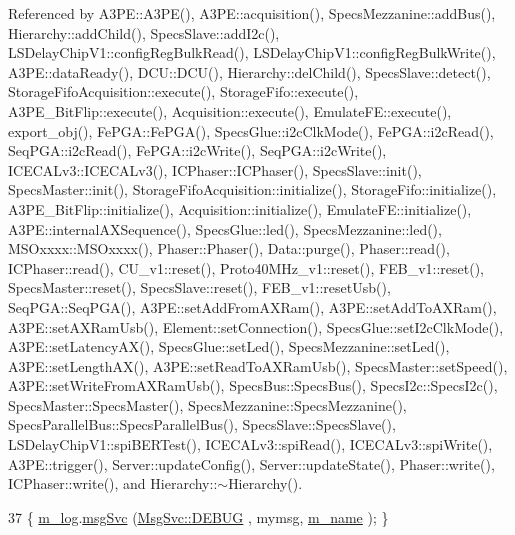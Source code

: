 Referenced by A3\+P\+E\+::\+A3\+P\+E(), A3\+P\+E\+::acquisition(), Specs\+Mezzanine\+::add\+Bus(), Hierarchy\+::add\+Child(), Specs\+Slave\+::add\+I2c(), L\+S\+Delay\+Chip\+V1\+::config\+Reg\+Bulk\+Read(), L\+S\+Delay\+Chip\+V1\+::config\+Reg\+Bulk\+Write(), A3\+P\+E\+::data\+Ready(), D\+C\+U\+::\+D\+C\+U(), Hierarchy\+::del\+Child(), Specs\+Slave\+::detect(), Storage\+Fifo\+Acquisition\+::execute(), Storage\+Fifo\+::execute(), A3\+P\+E\+\_\+\+Bit\+Flip\+::execute(), Acquisition\+::execute(), Emulate\+F\+E\+::execute(), export\+\_\+obj(), Fe\+P\+G\+A\+::\+Fe\+P\+G\+A(), Specs\+Glue\+::i2c\+Clk\+Mode(), Fe\+P\+G\+A\+::i2c\+Read(), Seq\+P\+G\+A\+::i2c\+Read(), Fe\+P\+G\+A\+::i2c\+Write(), Seq\+P\+G\+A\+::i2c\+Write(), I\+C\+E\+C\+A\+Lv3\+::\+I\+C\+E\+C\+A\+Lv3(), I\+C\+Phaser\+::\+I\+C\+Phaser(), Specs\+Slave\+::init(), Specs\+Master\+::init(), Storage\+Fifo\+Acquisition\+::initialize(), Storage\+Fifo\+::initialize(), A3\+P\+E\+\_\+\+Bit\+Flip\+::initialize(), Acquisition\+::initialize(), Emulate\+F\+E\+::initialize(), A3\+P\+E\+::internal\+A\+X\+Sequence(), Specs\+Glue\+::led(), Specs\+Mezzanine\+::led(), M\+S\+Oxxxx\+::\+M\+S\+Oxxxx(), Phaser\+::\+Phaser(), Data\+::purge(), Phaser\+::read(), I\+C\+Phaser\+::read(), C\+U\+\_\+v1\+::reset(), Proto40\+M\+Hz\+\_\+v1\+::reset(), F\+E\+B\+\_\+v1\+::reset(), Specs\+Master\+::reset(), Specs\+Slave\+::reset(), F\+E\+B\+\_\+v1\+::reset\+Usb(), Seq\+P\+G\+A\+::\+Seq\+P\+G\+A(), A3\+P\+E\+::set\+Add\+From\+A\+X\+Ram(), A3\+P\+E\+::set\+Add\+To\+A\+X\+Ram(), A3\+P\+E\+::set\+A\+X\+Ram\+Usb(), Element\+::set\+Connection(), Specs\+Glue\+::set\+I2c\+Clk\+Mode(), A3\+P\+E\+::set\+Latency\+A\+X(), Specs\+Glue\+::set\+Led(), Specs\+Mezzanine\+::set\+Led(), A3\+P\+E\+::set\+Length\+A\+X(), A3\+P\+E\+::set\+Read\+To\+A\+X\+Ram\+Usb(), Specs\+Master\+::set\+Speed(), A3\+P\+E\+::set\+Write\+From\+A\+X\+Ram\+Usb(), Specs\+Bus\+::\+Specs\+Bus(), Specs\+I2c\+::\+Specs\+I2c(), Specs\+Master\+::\+Specs\+Master(), Specs\+Mezzanine\+::\+Specs\+Mezzanine(), Specs\+Parallel\+Bus\+::\+Specs\+Parallel\+Bus(), Specs\+Slave\+::\+Specs\+Slave(), L\+S\+Delay\+Chip\+V1\+::spi\+B\+E\+R\+Test(), I\+C\+E\+C\+A\+Lv3\+::spi\+Read(), I\+C\+E\+C\+A\+Lv3\+::spi\+Write(), A3\+P\+E\+::trigger(), Server\+::update\+Config(), Server\+::update\+State(), Phaser\+::write(), I\+C\+Phaser\+::write(), and Hierarchy\+::$\sim$\+Hierarchy().


\begin{DoxyCode}
37 \{ \hyperlink{classObject_a0d269813dd7ac1f24bc143031e2963f2}{m\_log}.\hyperlink{classMsgSvc_ad25f18047920cc59a314e5098259711c}{msgSvc} (\hyperlink{classMsgSvc_ae671eb7301996cd049d2da8a65925926a1dbdcc82dce88370ec335883c83b38b0}{MsgSvc::DEBUG}   , mymsg, \hyperlink{classObject_a8b83c95c705d2c3ba0d081fe1710f48d}{m\_name} ); \}
\end{DoxyCode}
\mbox{\label{classObject_a6c9a0397ca804e04d675ed05683f5420}} 
